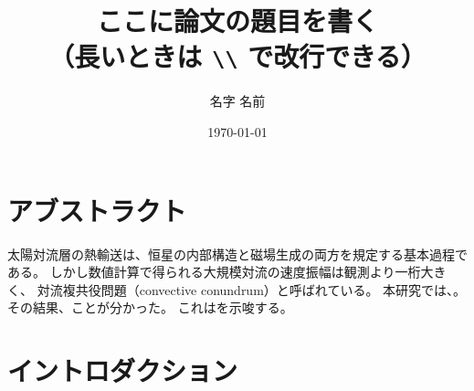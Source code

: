 \documentclass[a4paper,11pt,twoside,openright]{ltjsbook}
\title{ここに論文の題目を書く\\（長いときは \texttt{\textbackslash\textbackslash} で改行できる）}
\author{名字 名前}
\date{\today}                  %
\begin{document}
\frontmatter

\maketitle
\thispagestyle{empty}

\chapter*{アブストラクト}

太陽対流層の熱輸送は、恒星の内部構造と磁場生成の両方を規定する基本過程である。
しかし数値計算で得られる大規模対流の速度振幅は観測より一桁大きく、
対流複共役問題（convective conundrum）と呼ばれている。
本研究では、。
その結果、ことが分かった。
これはを示唆する。

\tableofcontents
\listoffigures
\listoftables

\mainmatter


\chapter{イントロダクション}
\label{chap:introduction}

\end{document}
